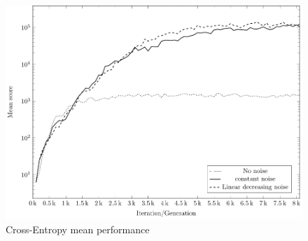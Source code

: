 \clearpage

\begin{figure}[H]
\begin{center}
\includegraphics[scale=1]{plots/meansPlot}
\end{center}
\caption{Cross-Entropy mean performance}
\end{figure}

